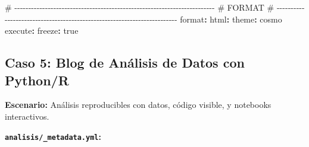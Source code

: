 \documentclass[
  doc,
  floatsintext,
  longtable,
  a4paper,
  nolmodern,
  notxfonts,
  notimes,
  12pt,
  colorlinks=true,linkcolor=blue,citecolor=blue,urlcolor=blue]{apa7}
\newenvironment{Shaded}{\begin{snugshade}}{\end{snugshade}}
\newcommand{\AttributeTok}[1]{\textcolor[rgb]{0.40,0.45,0.13}{#1}}
\newcommand{\CharTok}[1]{\textcolor[rgb]{0.13,0.47,0.30}{#1}}
\newcommand{\CommentTok}[1]{\textcolor[rgb]{0.37,0.37,0.37}{#1}}
\newcommand{\FunctionTok}[1]{\textcolor[rgb]{0.28,0.35,0.67}{#1}}
\newcommand{\KeywordTok}[1]{\textcolor[rgb]{0.00,0.23,0.31}{\textbf{#1}}}
\begin{document}
\begin{Shaded}
\begin{Highlighting}[]
\CommentTok{\# {-}{-}{-}{-}{-}{-}{-}{-}{-}{-}{-}{-}{-}{-}{-}{-}{-}{-}{-}{-}{-}{-}{-}{-}{-}{-}{-}{-}{-}{-}{-}{-}{-}{-}{-}{-}{-}{-}{-}{-}{-}{-}{-}{-}{-}{-}{-}{-}{-}{-}{-}{-}{-}{-}{-}{-}{-}{-}{-}{-}{-}{-}{-}{-}{-}{-}{-}{-}{-}{-}{-}{-}}
\CommentTok{\# FORMAT}
\CommentTok{\# {-}{-}{-}{-}{-}{-}{-}{-}{-}{-}{-}{-}{-}{-}{-}{-}{-}{-}{-}{-}{-}{-}{-}{-}{-}{-}{-}{-}{-}{-}{-}{-}{-}{-}{-}{-}{-}{-}{-}{-}{-}{-}{-}{-}{-}{-}{-}{-}{-}{-}{-}{-}{-}{-}{-}{-}{-}{-}{-}{-}{-}{-}{-}{-}{-}{-}{-}{-}{-}{-}{-}{-}}
\FunctionTok{format}\KeywordTok{:}
\AttributeTok{  }\FunctionTok{html}\KeywordTok{:}
\AttributeTok{    }\FunctionTok{theme}\KeywordTok{:}\AttributeTok{ cosmo}
\AttributeTok{    }
\FunctionTok{execute}\KeywordTok{:}
\AttributeTok{  }\FunctionTok{freeze}\KeywordTok{:}\AttributeTok{ }\CharTok{true}
\end{Highlighting}
\end{Shaded}

\subsection{Caso 5: Blog de Análisis de Datos con
Python/R}\label{caso-5-blog-de-anuxe1lisis-de-datos-con-pythonr}

\textbf{Escenario:} Análisis reproducibles con datos, código visible, y
notebooks interactivos.

\textbf{\texttt{analisis/\_metadata.yml}:}
\end{document}

